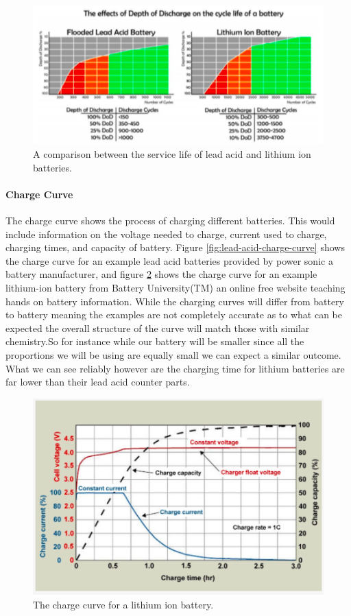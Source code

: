 \begin{figure}
    \centering
    \includegraphics[scale=0.5]{figures/service life.png}
    \caption{A comparison between the service life of lead acid and lithium ion batteries.}
    \label{fig:service-life} 
\end{figure}

\paragraph{Charge Curve}
The charge curve shows the process of charging different batteries. This would include information on the voltage needed to charge, current used to charge, charging times, and capacity of battery. Figure \ref{fig:lead-acid-charge-curve} shows the charge curve for an example lead acid batteries provided by power sonic a battery manufacturer, and figure \ref{fig:lithium-charge-curve} shows the charge curve for an example lithium-ion battery from Battery University(TM) an online free website teaching hands on battery information. While the charging curves will differ from battery to battery meaning the examples are not completely accurate as to what can be expected the overall structure of the curve will match those with similar chemistry.So for instance while our battery will be smaller since all the proportions we will be using are equally small we can expect a similar outcome. What we can see reliably however are the charging time for lithium batteries are far lower than their lead acid counter parts.

\begin{figure}
    \centering
    \includegraphics[scale=0.5]{figures/lithium charge curve.png}
    \caption{The charge curve for a lithium ion battery.}
    \label{fig:lithium-charge-curve} 
\end{figure}

